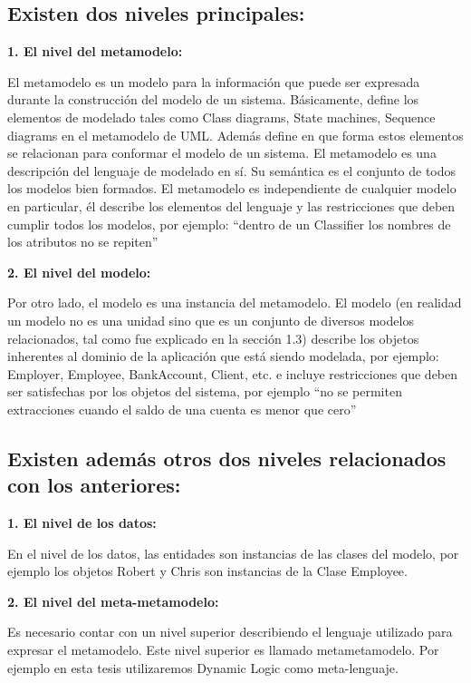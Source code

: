 \subsection{Existen dos niveles principales:}
\begin{spacing}{2.0}
\end{spacing}
\textbf{1. El nivel del metamodelo:}
\begin{spacing}{2.0}
\end{spacing}
El metamodelo es un modelo para la información que puede ser
expresada durante la construcción del modelo de un sistema. Básicamente, define los
elementos de modelado tales como Class diagrams, State machines, Sequence diagrams
en el metamodelo de UML. Además define en que forma estos elementos se relacionan para
conformar el modelo de un sistema. El metamodelo es una descripción del lenguaje de
modelado en sí. Su semántica es el conjunto de todos los modelos bien formados. El
metamodelo es independiente de cualquier modelo en particular, él describe los elementos
del lenguaje y las restricciones que deben cumplir todos los modelos, por ejemplo: “dentro
de un Classifier los nombres de los atributos no se repiten”
\begin{spacing}{2.0}
\end{spacing}

\textbf{2. El nivel del modelo:}
\begin{spacing}{2.0}
\end{spacing}
Por otro lado, el modelo es una instancia del metamodelo. El modelo
(en realidad un modelo no es una unidad sino que es un conjunto de diversos modelos
relacionados, tal como fue explicado en la sección 1.3) describe los objetos inherentes al
dominio de la aplicación que está siendo modelada, por ejemplo: Employer, Employee,
BankAccount, Client, etc. e incluye restricciones que deben ser satisfechas por los objetos
del sistema, por ejemplo “no se permiten extracciones cuando el saldo de una cuenta es
menor que cero”
\begin{spacing}{2.0}
\end{spacing}
\subsection{Existen además otros dos niveles relacionados con los anteriores:}
\begin{spacing}{2.0}
\end{spacing}

\textbf{1. El nivel de los datos:}
\begin{spacing}{2.0}
\end{spacing}
 En el nivel de los datos, las entidades son instancias de las clases del
modelo, por ejemplo los objetos Robert y Chris son instancias de la Clase Employee.
\begin{spacing}{2.0}
\end{spacing}
\textbf{2. El nivel del meta-metamodelo:}
\begin{spacing}{2.0}
\end{spacing}
Es necesario contar con un nivel superior describiendo el
lenguaje utilizado para expresar el metamodelo. Este nivel superior es llamado metametamodelo. Por ejemplo en esta tesis utilizaremos Dynamic Logic como meta-lenguaje.

